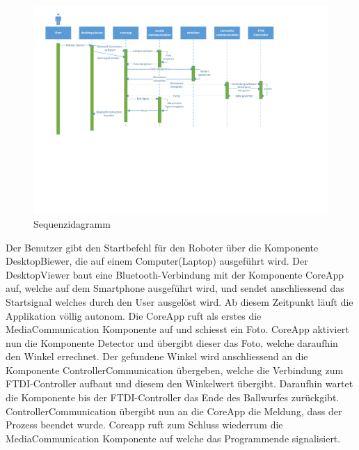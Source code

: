     	\begin{figure}[h!]
    		\centering
    		\includegraphics[width=1\textwidth,clip,trim= 11mm 88mm 55mm 8mm]
    		{Enddokumentation/Loesungskonzept/Bilder/Sequenzdiagramm.pdf}
    		\caption{Sequenzidagramm}		
    	\end{figure}
        Der Benutzer gibt den Startbefehl für den Roboter über die Komponente 
        DesktopBiewer, die auf einem Computer(Laptop) ausgeführt wird. Der DesktopViewer 
        baut eine Bluetooth-Verbindung mit der Komponente CoreApp auf, welche auf dem 
        Smartphone ausgeführt wird, und sendet anschliessend das Startsignal welches 
        durch den User ausgelöst wird. Ab diesem Zeitpunkt läuft die Applikation völlig 
        autonom. Die CoreApp ruft als erstes die MediaCommunication Komponente auf und 
        schiesst ein Foto. CoreApp aktiviert nun die Komponente Detector und übergibt 
        dieser das Foto, welche daraufhin den Winkel errechnet. Der gefundene Winkel 
        wird anschliessend an die Komponente ControllerCommunication übergeben, welche 
        die Verbindung zum FTDI-Controller aufbaut und diesem den Winkelwert übergibt. 
        Daraufhin wartet die Komponente bis der FTDI-Controller das Ende des Ballwurfes 
        zurückgibt. ControllerCommunication übergibt nun an die CoreApp die Meldung, 
        dass der Prozess beendet wurde. Coreapp ruft zum Schluss wiederrum die 
        MediaCommunication Komponente auf welche das Programmende signalisiert.